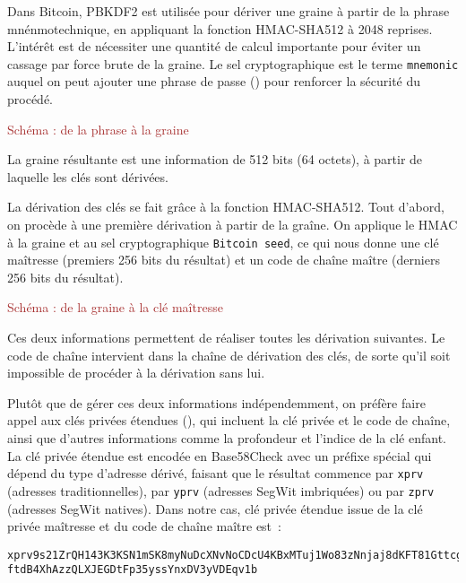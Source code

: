 Dans Bitcoin, PBKDF2 est utilisée pour dériver une graine à partir de la phrase mnénmotechnique, en appliquant la fonction HMAC-SHA512 à 2048 reprises. L'intérêt est de nécessiter une quantité de calcul importante pour éviter un cassage par force brute de la graine. Le sel cryptographique est le terme \texttt{mnemonic} auquel on peut ajouter une phrase de passe () pour renforcer la sécurité du procédé.

\textcolor{brown}{Schéma : de la phrase à la graine}

La graine résultante est une information de 512 bits (64 octets), à partir de laquelle les clés sont dérivées.


La dérivation des clés se fait grâce à la fonction HMAC-SHA512. Tout d'abord, on procède à une première dérivation à partir de la graîne. On applique le HMAC à la graine et au sel cryptographique \texttt{Bitcoin seed}, ce qui nous donne une clé maîtresse (premiers 256 bits du résultat) et un code de chaîne maître (derniers 256 bits du résultat).

\textcolor{brown}{Schéma : de la graine à la clé maîtresse}


Ces deux informations permettent de réaliser toutes les dérivation suivantes. Le code de chaîne intervient dans la chaîne de dérivation des clés, de sorte qu'il soit impossible de procéder à la dérivation sans lui.

Plutôt que de gérer ces deux informations indépendemment, on préfère faire appel aux clés privées étendues (), qui incluent la clé privée et le code de chaîne, ainsi que d'autres informations comme la profondeur et l'indice de la clé enfant. La clé privée étendue est encodée en Base58Check avec un préfixe spécial qui dépend du type d'adresse dérivé, faisant que le résultat commence par \texttt{xprv} (adresses traditionnelles), par \texttt{yprv} (adresses SegWit imbriquées) ou par \texttt{zprv} (adresses SegWit natives). Dans notre cas, clé privée étendue issue de la clé privée maîtresse et du code de chaîne maître est~:

\begin{Verbatim}[fontsize=\footnotesize]
xprv9s21ZrQH143K3KSN1mSK8myNuDcXNvNoCDcU4KBxMTuj1Wo83zNnjaj8dKFT81GttcgP
ftdB4XhAzzQLXJEGDtFp35yssYnxDV3yVDEqv1b
\end{Verbatim}

